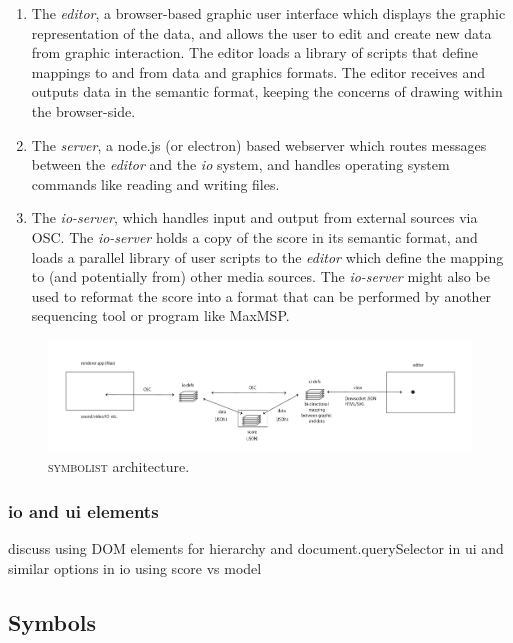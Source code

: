 \documentclass{article}
\def\symbolist{\textsc{symbolist}\xspace}
\begin{document}
\begin{enumerate}\itemsep0pt
\item The \textit{editor}, a browser-based graphic user interface which displays the graphic representation of the data, and allows the user to edit and create new data from graphic interaction. The editor loads a library of scripts that define mappings to and from data and graphics formats. The editor receives and outputs data in the semantic format, keeping the concerns of drawing within the browser-side.

\item The \textit{server}, a node.js (or electron) based webserver which routes messages between the \textit{editor} and the \textit{io} system, and handles operating system commands like reading and writing files.

\item  The \textit{io-server}, which handles input and output from external sources via OSC. The \textit{io-server} holds a copy of the score in its semantic format, and loads a parallel library of user scripts to the \textit{editor} which define the mapping to (and potentially from) other media sources. The \textit{io-server} might also be used to reformat the score into a format that can be performed by another sequencing tool or program like MaxMSP.
\end{enumerate}

\begin{figure}[ht!]
\centering
\includegraphics[width=2\columnwidth]{symbolist-architecture.pdf}
\caption{ \symbolist architecture.
\label{fig:architecture}}
\end{figure}


\subsubsection{io and ui elements}\label{subsec:io_ui_elements}

discuss using DOM elements for hierarchy and document.querySelector in ui
and similar options in io using score vs model




\subsection{Symbols}\label{subsec:symbols}
\end{document}
